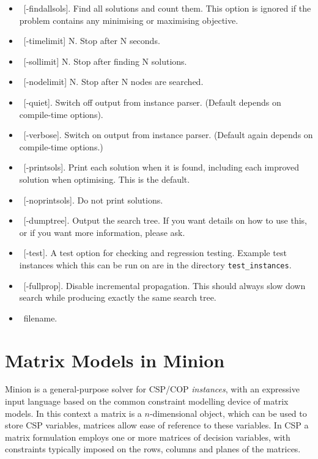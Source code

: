 \documentclass{article}
\begin{document}
\begin{small}
\begin{itemize}
\item\ [-findallsols].   Find all solutions and count them.   This option is ignored if the problem contains any minimising or maximising objective.
\item\ [-timelimit] N. Stop after N seconds.
\item\ [-sollimit] N. Stop after finding N solutions.
\item\ [-nodelimit] N. Stop after N nodes are searched.
\item\ [-quiet]. Switch off output from instance parser.  (Default depends on compile-time options).
\item\ [-verbose]. Switch on output from instance parser.  (Default again depends on compile-time options.)
\item\ [-printsols].   Print each solution when it is found, including each improved solution when optimising.  This is the default.
\item\ [-noprintsols].   Do not print solutions.
\item\ [-dumptree]. Output the search tree. If you want details on how to use this, or if you want more information, please ask.
\item\ [-test].  A test option for checking and regression testing.   Example test instances which this can be run on are in the directory {\tt test\_instances}.   
\item\ [-fullprop]. Disable incremental propagation. This should always slow down search while producing exactly the same search tree.
\item\ filename.
\end{itemize}

\section{Matrix Models in {\sc Minion}}\label{sect_matrix}

{\sc Minion} is a general-purpose solver for CSP/COP {\em instances},
with an expressive input language based on the common constraint
modelling device of matrix models. In this context a matrix is a
$n$-dimensional object, which can be used to store CSP variables,
matrices allow ease of reference to these variables. In CSP a matrix
formulation employs one or more matrices of decision variables, with
constraints typically imposed on the rows, columns and planes of the
matrices.


\end{small}
\end{document}
